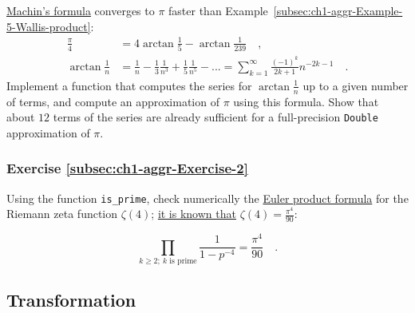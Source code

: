 \href{http://turner.faculty.swau.edu/mathematics/materialslibrary/pi/machin.html}{Machin's formula}
converges to $\pi$ faster than Example~\ref{subsec:ch1-aggr-Example-5-Wallis-product}:
\begin{align*}
\frac{\pi}{4} & =4\arctan\frac{1}{5}-\arctan\frac{1}{239}\quad,\\
\arctan\frac{1}{n} & =\frac{1}{n}-\frac{1}{3}\frac{1}{n^{3}}+\frac{1}{5}\frac{1}{n^{5}}-...=\sum_{k=1}^{\infty}\frac{\left(-1\right)^{k}}{2k+1}n^{-2k-1}\quad.
\end{align*}
Implement a function that computes the series for $\arctan\frac{1}{n}$
up to a given number of terms, and compute an approximation of $\pi$
using this formula. Show that about $12$ terms of the series are
already sufficient for a full-precision \lstinline!Double!
approximation of $\pi$.%
\begin{comment}
Code: def at(n: Double, l: Int) = (1 to l).map(k => 1.0{*}(k \% 2
{*} 2 - 1) / (2{*}k-1) / math.pow(n, 2{*}k-1) ).sum ; def p(l: Int)
= 16{*}at(5, l) - 4{*}at(239, l); p(12)
\end{comment}


\subsubsection{Exercise \label{subsec:ch1-aggr-Exercise-2}\ref{subsec:ch1-aggr-Exercise-2}}

Using the function \lstinline!is_prime!,
check numerically the \href{https://en.wikipedia.org/wiki/Proof_of_the_Euler_product_formula_for_the_Riemann_zeta_function}{Euler product formula}
for the Riemann zeta function $\zeta(4)$; \href{https://ocw.mit.edu/courses/mathematics/18-104-seminar-in-analysis-applications-to-number-theory-fall-2006/projects/chan.pdf}{it is known that}
$\zeta(4)=\frac{\pi^{4}}{90}$:%
\begin{comment}
Code: def is\_prime(n: Int) = (2 to n-1).takeWhile(k => k{*}k <= n).forall(k
=> n \% k != 0); def ep(n: Int): Double = (2 to n).filter(is\_prime).map(k
=> 1.0 / (1.0 - 1.0 / k/k/k/k)).product; ep(100); pi{*}pi{*}pi{*}pi/90;
\end{comment}
\[
\prod_{k\geq2;~k\text{ is prime}}\frac{1}{1-p^{-4}}=\frac{\pi^{4}}{90}\quad.
\]
{} 

\subsection{Transformation}

